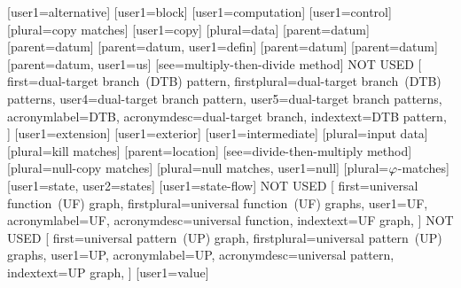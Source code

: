 [user1={alternative}]
[user1={block}]
[user1={computation}]
[user1={control}]
[plural={copy matches}]
[user1={copy}]
[plural={data}]
[parent={datum}]
[parent={datum}]
[parent={datum}, user1={defin}]
[parent={datum}]
[parent={datum}]
[parent={datum}, user1={us}]
[see={multiply-then-divide method}]
%
           {NOT USED}%
           [%
             first={dual-target branch~(DTB) pattern},
             firstplural={dual-target branch~(DTB) patterns},
             user4={dual-target branch pattern},
             user5={dual-target branch patterns},
             acronymlabel={DTB},
             acronymdesc={dual-target branch},
             indextext={DTB pattern},
           ]
[user1={extension}]
[user1={exterior}]
[user1={intermediate}]
[plural={input data}]
[plural={kill matches}]
[parent={location}]
[see={divide-then-multiply method}]
[plural={null-copy matches}]
[plural={null matches}, user1={null}]
[plural={{}$\varphi$-matches}]
[user1={state}, user2={states}]
[user1={state-flow}]
%
           {NOT USED}%
           [%
             first={universal function~(UF) graph},
             firstplural={universal function~(UF) graphs},
             user1={UF},
             acronymlabel={UF},
             acronymdesc={universal function},
             indextext={UF graph},
           ]
%
           {NOT USED}%
           [%
             first={universal pattern~(UP) graph},
             firstplural={universal pattern~(UP) graphs},
             user1={UP},
             acronymlabel={UP},
             acronymdesc={universal pattern},
             indextext={UP graph},
           ]
[user1={value}]


